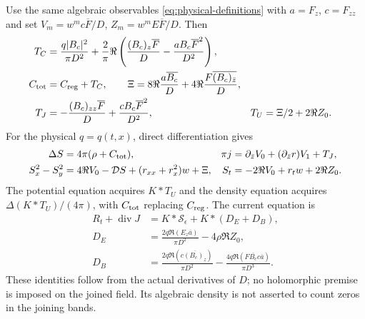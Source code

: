 Use the same algebraic observables \eqref{eq:physical-definitions}
with $a=F_z$, $c=F_{zz}$ and set
$V_m=w^mc\overline F/D$, $Z_m=w^mE\overline F/D$. Then
\begin{align}
 T_C&=\frac{q|B_c|^2}{\pi D^2}
  +\frac2\pi\Re\left(\frac{(B_c)_z\overline F}{D}
                       -\frac{aB_c\overline F^2}{D^2}\right),\\
 C_{\rm tot}&=C_{\rm reg}+T_C,\qquad
 \Xi=8\Re\frac{a\overline{B_c}}D
                  +4\Re\frac{F\overline{(B_c)_{\bar z}}}D,\\
 T_J&=-\frac{(B_c)_{zz}\overline F}{D}
                    +\frac{cB_c\overline F^2}{D^2},
 &T_U&=\Xi/2+2\Re Z_0.
 \label{eq:nonholomorphic-corrections}
\end{align}
For the physical $q=q(t,x)$, direct differentiation gives
\begin{align}
 \Delta S&=4\pi(\rho+C_{\rm tot}),
 &\pi j&=\partial_{\bar z}V_0+(\partial_{\bar z}r)V_1+T_J,\\
 S_x^2-S_y^2&=4\Re V_0-\mathcal D S+(r_{xx}+r_x^2)w+\Xi,
 &S_t&=-2\Re V_0+r_tw+2\Re Z_0.
 \label{eq:nonholomorphic-primitives}
\end{align}
The potential equation acquires $K*T_U$ and the density equation
acquires $\Delta(K*T_U)/(4\pi)$, with $C_{\rm tot}$ replacing
$C_{\rm reg}$. The current equation is
\begin{align}
 R_t+\operatorname{div}J&=K*\mathcal S_\epsilon+K*(D_E+D_B),\\
 D_E&=\frac{2q\Re(E_z\overline a)}{\pi D^2}-4\rho\Re Z_0,\\
 D_B&=\frac{2q\Re(c\overline{(B_c)_z})}{\pi D^2}
              -\frac{4q\Re(F\overline{B_c}c\overline a)}{\pi D^3}.
 \label{eq:nonholomorphic-current}
\end{align}
These identities follow from the actual derivatives of $D$; no
holomorphic premise is imposed on the joined field. Its algebraic
density is not asserted to count zeros in the joining bands.

